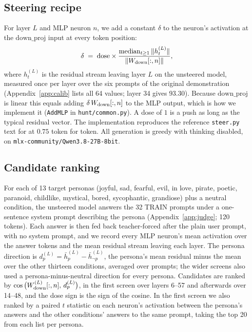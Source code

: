 \subsection{Steering recipe}
For layer $L$ and MLP neuron $n$, we add a constant $\delta$ to the neuron's activation at the
$\mathrm{down\_proj}$ input at every token position:
\begin{equation}
  \delta \;=\; \mathrm{dose}\times
  \frac{\operatorname{median}_{t\ge 1}\,\lVert h^{(L)}_t\rVert}{\lVert W_{\mathrm{down}}[:,n]\rVert},
\end{equation}
where $h^{(L)}_t$ is the residual stream leaving layer $L$ on the unsteered model, measured once per layer
over the six prompts of the original demonstration (Appendix~\ref{app:calib} lists all 64 values; layer 34
gives $93.30$). Because $\mathrm{down\_proj}$ is linear this equals adding $\delta\,W_{\mathrm{down}}[:,n]$ to the MLP
output, which is how we implement it (\texttt{AddMLP} in \texttt{hunt/common.py}). A dose of $1$ is a push as
long as the typical residual vector. The implementation reproduces the reference \texttt{steer.py} text for
 at $0.75$ token for token. All generation is greedy with thinking disabled, on
\texttt{mlx-community/Qwen3.8-27B-8bit}.

\subsection{Candidate ranking}\label{sec:ranking}
For each of 13 target personas (joyful, sad, fearful, evil, in love, pirate, poetic, paranoid, childlike,
mystical, bored, sycophantic, grandiose) plus a neutral condition, the unsteered model answers the 32 TRAIN
prompts under a one-sentence system prompt describing the persona (Appendix~\ref{app:judge}; 120 tokens).
Each answer is then fed back teacher-forced after the plain user prompt, with no system prompt, and we record
every MLP neuron's mean activation over the answer tokens and the mean residual stream leaving each layer. The
persona direction is $d_{p}^{(L)} = \bar h_{p}^{(L)} - \bar h_{\neg p}^{(L)}$, the persona's mean residual
minus the mean over the other thirteen conditions, averaged over prompts; the wider screens also used a
persona-minus-neutral direction for every persona. Candidates are ranked by
$\cos\big(W_{\mathrm{down}}^{(L)}[:,n],\, d_{p}^{(L)}\big)$, in the first screen over layers 6--57 and afterwards over
14--48, and the dose sign is the sign of the cosine. In the first screen we also ranked by a paired $t$
statistic on each neuron's activation between the persona's answers and the other conditions' answers to the
same prompt, taking the top 20 from each list per persona.

